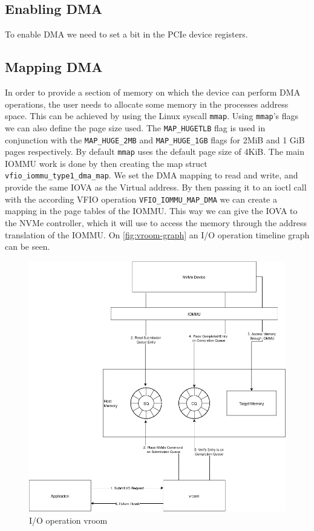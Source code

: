 \subsection{Enabling DMA}
To enable DMA we need to set a bit in the PCIe device registers.

\subsection{Mapping DMA}
In order to provide a section of memory on which the device can perform DMA operations, the user needs to allocate some memory in the processes address space. This can be achieved by using the Linux syscall \texttt{mmap}.
Using \texttt{mmap}'s flags we can also define the page size used.
The \texttt{MAP\_HUGETLB} flag is used in conjunction with the \texttt{MAP\_HUGE\_2MB} and \texttt{MAP\_HUGE\_1GB} flags for 2MiB and 1 GiB pages respectively.
By default \texttt{mmap} uses the default page size of 4KiB.
The main IOMMU work is done by then creating the map struct \texttt{vfio\_iommu\_type1\_dma\_map}. We set the DMA mapping to read and write, and provide the same IOVA as the Virtual address. By then passing it to an ioctl call with the according VFIO operation \texttt{VFIO\_IOMMU\_MAP\_DMA} we can create a mapping in the page tables of the IOMMU. This way we can give the IOVA to the NVMe controller, which it will use to access the memory through the address translation of the IOMMU.
On \autoref{fig:vroom-graph} an I/O operation timeline graph can be seen.

\begin{figure}
    \centering
    \includegraphics[width=\textwidth]{figures/vroomgraphlight.png}
    \caption{I/O operation vroom}
    \label{fig:vroom-graph}
\end{figure}

